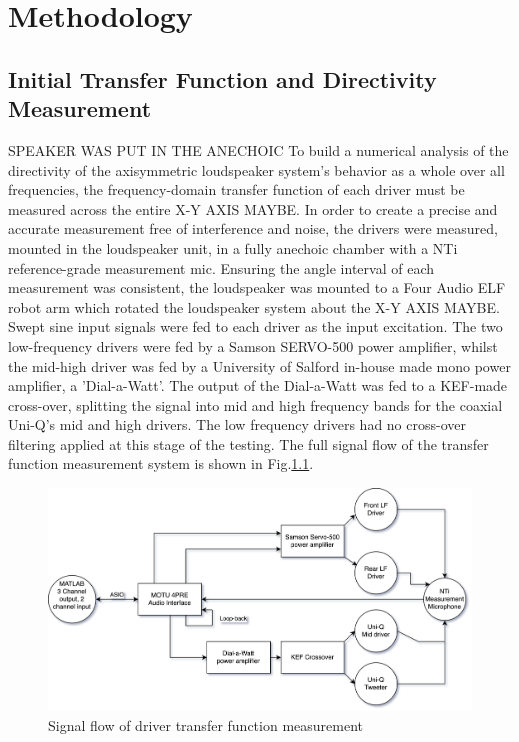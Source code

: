 \documentclass{report}
\begin{document}
\chapter{Methodology}
    \section{Initial Transfer Function and Directivity Measurement}
        SPEAKER WAS PUT IN THE ANECHOIC
        To build a numerical analysis of the directivity of the axisymmetric loudspeaker system's behavior as a whole over all frequencies, the frequency-domain transfer function of each driver must be measured across the entire X-Y AXIS MAYBE.
        In order to create a precise and accurate measurement free of interference and noise, the drivers were measured, mounted in the loudspeaker unit, in a fully anechoic chamber with a NTi reference-grade measurement mic.
        Ensuring the angle interval of each measurement was consistent, the loudspeaker was mounted to a Four Audio ELF robot arm which rotated the loudspeaker system about the X-Y AXIS MAYBE.
        Swept sine input signals were fed to each driver as the input excitation.
        The two low-frequency drivers were fed by a Samson SERVO-500 power amplifier, whilst the mid-high driver was fed by a University of Salford in-house made mono power amplifier, a 'Dial-a-Watt'.
        The output of the Dial-a-Watt was fed to a KEF-made cross-over, splitting the signal into mid and high frequency bands for the coaxial Uni-Q's mid and high drivers.
        The low frequency drivers had no cross-over filtering applied at this stage of the testing.
        The full signal flow of the transfer function measurement system is shown in Fig.\ref{signalFlow}.
        \begin{figure}[H]
            \centering
            \includegraphics[scale=0.04]{figs/signalFlow.png}%
            \caption{Signal flow of driver transfer function measurement}
            \label{signalFlow}
        \end{figure}
\end{document}
